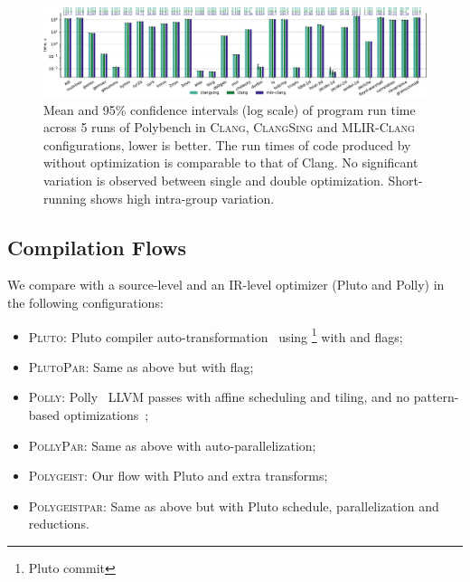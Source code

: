
%
%
\begin{figure}
\centering
\includegraphics[width=\textwidth]{images/times.pdf}
\caption{Mean and 95\% confidence intervals (log scale) of program run time across 5 runs of Polybench in \textsc{Clang}, \textsc{ClangSing} and \textsc{MLIR-Clang} configurations, lower is better. The run times of code produced by \tool without optimization is comparable to that of Clang. No significant variation is observed between single and double optimization. Short-running  shows high intra-group variation.}
\label{fig:mlir_clang}
\end{figure}

\subsection{Compilation Flows}
\label{sub:polymer}

We compare \tool with a source-level and an IR-level optimizer (Pluto and Polly) in the following configurations:
\begin{itemize}
  \item \textsc{Pluto}: Pluto compiler auto-transformation~\cite{Bondhugula2008Pluto} using \polycc\footnote{Pluto commit } with  and  flags;
  \item \textsc{PlutoPar}: Same as above but with  flag;
  \item \textsc{Polly}: Polly~\cite{grosser.ppl.2012} LLVM passes with affine scheduling and tiling, and no pattern-based optimizations~\cite{gareev_polly};
  \item \textsc{PollyPar}: Same as above with auto-parallelization;
  \item \textsc{Polygeist}: Our flow with Pluto and extra transforms;
  \item \textsc{Polygeistpar}: Same as above but with  Pluto schedule, \tool parallelization and reductions.
\end{itemize}


